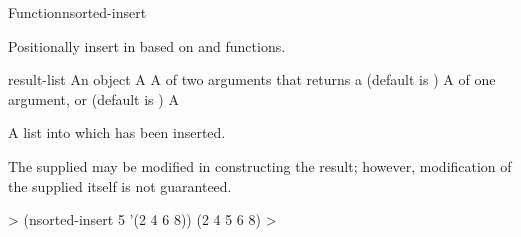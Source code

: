 \documentclass[10pt,twoside,english,pdftex]{article}
\begin{document}
\begin{functiondoc}{Function}{nsorted-insert}{
    }
%
%
  
\fnsyntax

\fnpurpose Positionally insert  in  based on
 and  functions.

\fnpackage {}

\fnmodule {}

\fnargs
\begin{args}{result-list}
\arg[item] An object
\arg[list] A 
\arg[predicate] A  of two arguments that returns a
 (default is )
\arg[key] A  of one argument, or \nil{} (default is \nil)
 A 
\end{args}

\fnreturns A list into which  has been inserted.

\fndescription The supplied  may be modified in
constructing the result; however, modification of the supplied
 itself is not guaranteed.

\fnexample
%
\W\supp
\begin{example}
  > (nsorted-insert 5 '(2 4 6 8))
  (2 4 5 6 8)
  >
\end{example}

\end{functiondoc}

\end{document}

